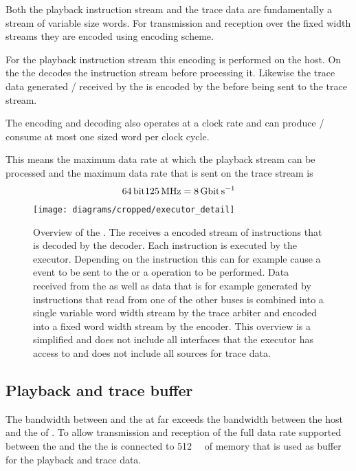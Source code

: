 Both the playback instruction stream and the trace data are fundamentally a stream of variable size words. For transmission and reception over the fixed width \HostARQ{} streams they are encoded using \UT{} encoding scheme\autocite{karasenko2020neumann}.

For the playback instruction stream this encoding is performed on the host. On the \FPGA{} the \pbexec{} decodes the instruction stream before processing it.
Likewise the trace data generated / received by the \pbexec{} is encoded by the \pbexec{} before being sent to the trace stream.

The encoding and decoding also operates at a \pbExecClock{} clock rate and can produce / consume at most one \PhyWordSize{} sized word per clock cycle.

This means the maximum data rate at which the playback stream can be processed and the maximum data rate that is sent on the trace stream is
\[\PhyWordSize{} \pbExecClock{} = \pbExecBandwidth{}\]

\begin{figure}
\centerline{\texttt{[image: diagrams/cropped/executor\_detail]}}
\caption{Overview of the \pbexec{}. The \pbexec{} receives a \UT{} encoded stream of instructions that is decoded by the \UT{} decoder. Each instruction is executed by the executor. Depending on the instruction this can for example cause a event to be sent to the \ASIC{} or a \JTAG{} operation to be performed. Data received from the \ASIC{} as well as data that is for example generated by instructions that read from one of the other \FPGA{} buses is combined into a single variable word width stream by the trace arbiter and encoded into a fixed word width stream by the \UT{} encoder.
This overview is a simplified and does not include all interfaces that the executor has access to and does not include all sources for trace data.}\label{diagram:executor}
\end{figure}

\subsection{Playback and trace buffer}\label{sec:old-pb-trace-management}
The bandwidth between \FPGA{} and the \ASIC{} at \ASICBandwidth{} far exceeds the bandwidth between the host and the \FPGA{} of \HostBandwidth{}. To allow transmission and reception of the full data rate supported between the \FPGA{} and the \ASIC{} the \FPGA{} is connected to \SI{512}{\mebi\byte} of \DDR{} memory that is used as buffer for the playback and trace data.

